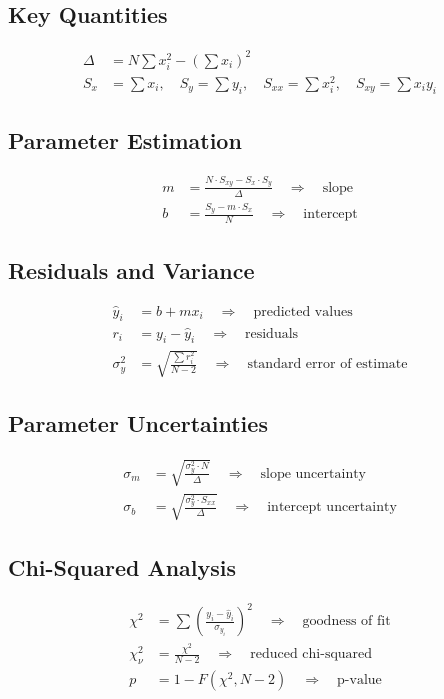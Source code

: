 \documentclass{article} %
\begin{document}
\subsection*{Key Quantities}
\begin{align*}
\Delta &= N \sum x_i^2 - \left(\sum x_i\right)^2 \\
S_x &= \sum x_i, \quad S_y = \sum y_i, \quad S_{xx} = \sum x_i^2, \quad S_{xy} = \sum x_i y_i
\end{align*}

\subsection*{Parameter Estimation}
\begin{align*}
m &= \frac{N \cdot S_{xy} - S_x \cdot S_y}{\Delta} \quad \Rightarrow \quad \text{slope} \\
b &= \frac{S_y - m \cdot S_x}{N} \quad \Rightarrow \quad \text{intercept}
\end{align*}

\subsection*{Residuals and Variance}
\begin{align*}
\hat{y}_i &= b + m x_i \quad \Rightarrow \quad \text{predicted values} \\
r_i &= y_i - \hat{y}_i \quad \Rightarrow \quad \text{residuals} \\
\sigma_y^2 &= \sqrt{\frac{\sum r_i^2}{N-2}} \quad \Rightarrow \quad \text{standard error of estimate}
\end{align*}

\subsection*{Parameter Uncertainties}
\begin{align*}
\sigma_m &= \sqrt{\frac{\sigma_y^2 \cdot N}{\Delta}} \quad \Rightarrow \quad \text{slope uncertainty} \\
\sigma_b &= \sqrt{\frac{\sigma_y^2 \cdot S_{xx}}{\Delta}} \quad \Rightarrow \quad \text{intercept uncertainty}
\end{align*}

\subsection*{Chi-Squared Analysis}
\begin{align*}
\chi^2 &= \sum \left(\frac{y_i - \hat{y}_i}{\sigma_{y_i}}\right)^2 \quad \Rightarrow \quad \text{goodness of fit} \\
\chi_\nu^2 &= \frac{\chi^2}{N-2} \quad \Rightarrow \quad \text{reduced chi-squared} \\
p &= 1 - F(\chi^2, N-2) \quad \Rightarrow \quad \text{p-value}
\end{align*}
\end{document}
